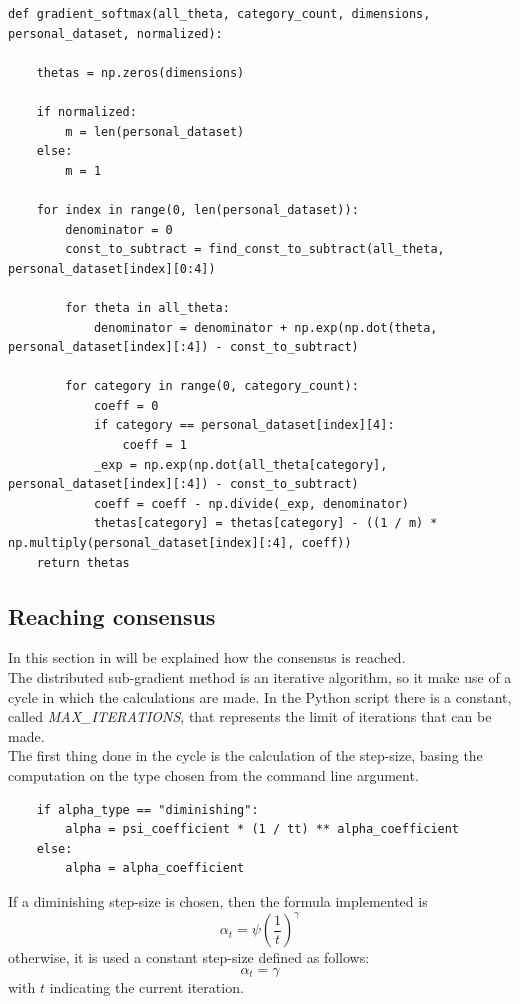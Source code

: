 \documentclass[a4paper,11pt,oneside]{book}
\begin{document}
\begin{lstlisting}
def gradient_softmax(all_theta, category_count, dimensions, personal_dataset, normalized):

    thetas = np.zeros(dimensions)

    if normalized:
        m = len(personal_dataset)
    else:
        m = 1

    for index in range(0, len(personal_dataset)):
        denominator = 0
        const_to_subtract = find_const_to_subtract(all_theta, personal_dataset[index][0:4])

        for theta in all_theta:
            denominator = denominator + np.exp(np.dot(theta, personal_dataset[index][:4]) - const_to_subtract)

        for category in range(0, category_count):
            coeff = 0
            if category == personal_dataset[index][4]:
                coeff = 1
            _exp = np.exp(np.dot(all_theta[category], personal_dataset[index][:4]) - const_to_subtract)
            coeff = coeff - np.divide(_exp, denominator)
            thetas[category] = thetas[category] - ((1 / m) * np.multiply(personal_dataset[index][:4], coeff))
    return thetas
\end{lstlisting}

\subsection {Reaching consensus}

In this section in will be explained how the consensus is reached.\\

The distributed sub-gradient method is an iterative algorithm, so it make use of a cycle in which the calculations are made. In the Python script there is a constant, called \textit{MAX\_ITERATIONS}, that represents the limit of iterations that can be made. \\
The first thing done in the cycle is the calculation of the step-size, basing the computation on the type chosen from the command line argument.

\begin{lstlisting}
    if alpha_type == "diminishing":
        alpha = psi_coefficient * (1 / tt) ** alpha_coefficient
    else:
        alpha = alpha_coefficient
\end{lstlisting}
If a diminishing step-size is chosen, then the formula implemented is
\begin{equation}
	\alpha_t = \psi \left( \dfrac{1}{t} \right)^\gamma
\end{equation}
otherwise, it is used a constant step-size defined as follows:
\begin{equation}
	\alpha_t = \gamma
\end{equation}
with $t$ indicating the current iteration. \\
\end{document}
